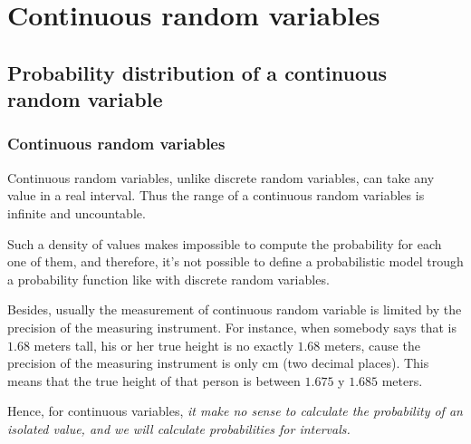 \section{Continuous random variables}



\subsection{Probability distribution of a continuous random variable}

\begin{frame}
\frametitle{Continuous random variables}
Continuous random variables, unlike discrete random variables, can take any value in a real interval. 
Thus the range of a continuous random variables is infinite and uncountable. 

Such a density of values makes impossible to compute the probability for each one of them, and therefore, it's not
possible to define a probabilistic model trough a probability function like with discrete random variables.

Besides, usually the measurement of continuous random variable is limited by the precision of the measuring instrument.
For instance, when somebody says that is $1.68$ meters tall, his or her true height is no exactly $1.68$ meters, cause
the precision of the measuring instrument is only cm (two decimal places). 
This means that the true height of that person is between $1.675$ y $1.685$ meters.

Hence, for continuous variables, \alert{\emph{it make no sense to calculate the probability of an isolated value, and we
will calculate probabilities for intervals.}}
\end{frame}



